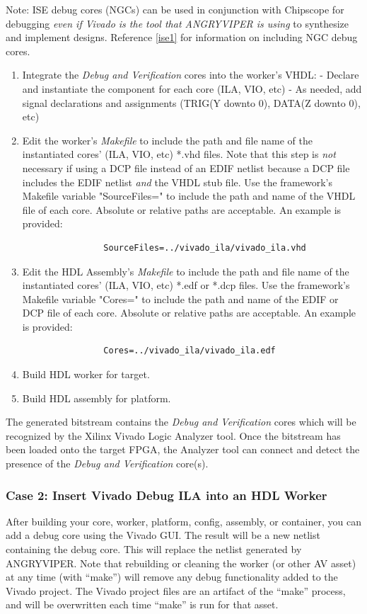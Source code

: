 \begin{flushleft}
Note: ISE debug cores (NGCs) can be used in conjunction with Chipscope for debugging \textit{even if Vivado is the tool that ANGRYVIPER is using} to synthesize and implement designs. Reference \ref{ise1} for information on including NGC debug cores.
		\begin{enumerate}
			\item Integrate the \textit{Debug and Verification} cores into the worker's VHDL:
				\subitem - Declare and instantiate the component for each core (ILA, VIO, etc)
				\subitem - As needed, add signal declarations and assignments (TRIG(Y downto 0), DATA(Z downto 0), etc)
			\item Edit the worker's \textit{Makefile} to include the path and file name of the
			instantiated cores' (ILA, VIO, etc) *.vhd files. Note that this step is \textit{not} necessary if using a DCP file instead of an EDIF netlist because a DCP file includes the EDIF netlist \textit{and} the VHDL stub file. Use the framework's Makefile
			variable "SourceFiles=" to include the path and	name of the VHDL file of each core.
			Absolute or relative paths are acceptable. An example is provided:
			\small\begin{verbatim}
				SourceFiles=../vivado_ila/vivado_ila.vhd
			\end{verbatim}
		 	\item Edit the HDL Assembly's \textit{Makefile} to include the path and file name of
		 	the	instantiated cores' (ILA, VIO, etc) *.edf or *.dcp files. Use the framework's
		 	Makefile variable "Cores=" to include the path and name of the EDIF or DCP file of each
		 	core. Absolute or relative paths are acceptable. An example is provided:
		 	\small\begin{verbatim}
		 		Cores=../vivado_ila/vivado_ila.edf
		 	\end{verbatim}
		 	\item Build HDL worker for target.
			\item Build HDL assembly for platform.
		\end{enumerate}

		The generated bitstream contains the \textit{Debug and Verification} cores which will be recognized by the Xilinx Vivado Logic Analyzer tool. Once the bitstream has been loaded onto the target FPGA, the Analyzer tool can connect and detect the presence of the \textit{Debug and Verification} core(s).

	\subsubsection{Case 2: Insert Vivado Debug ILA into an HDL Worker}
	After building your core, worker, platform, config, assembly, or container, you can add a debug core using the Vivado GUI. The result will be a new netlist containing the debug core. This will replace the netlist generated by ANGRYVIPER. Note that rebuilding or cleaning the worker (or other AV asset) at any time (with ``make'') will remove any debug functionality added to the Vivado project. The Vivado project files are an artifact of the ``make'' process, and will be overwritten each time ``make'' is run for that asset.\newline


\end{flushleft}
